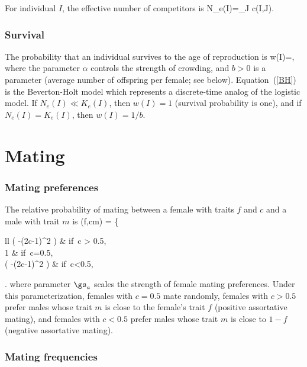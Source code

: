 \documentclass{article}
\begin{document}
For individual $I$, the effective number of competitors is 
\be
N_e(I)=\sum_J c(I,J).
\ee
\es

\subsubsection{Survival}

The probability that an individual survives to the age of reproduction is
	\be \label{BH}
		w(I)=,
	\ee
where the parameter $\alpha$ controls the strength of
crowding, and $b>0$ is a parameter (average number of offspring per female;
see below).  Equation~(\ref{BH}) is the Beverton-Holt model which
represents a discrete-time analog of the logistic model. If $N_e(I)\ll
K_e(I)$, then $w(I)=1$ (survival probability is one), and if
$N_e(I)=K_e(I)$, then $w(I)=1/b$.

\section{Mating}

\subsubsection{Mating preferences}

The relative probability of mating between a
female with traits $f$ and $c$ and a male with trait $m$ is
	\be  \label{pref}
	\psi(f,c\mid m) =  \left\{ \begin{array}{ll}
                         \exp \left( -(2c-1)^2 \right) & \mbox{if}\ c > 0.5, \\
			  1 & \mbox{if}\ c=0.5,\\
                         \exp \left( -(2c-1)^2 \right) & \mbox{if}\ c<0.5,
                      \end{array} \right.
	\ee
where parameter $\gs_a$ scales the strength of female mating preferences. Under this parameterization,
females with $c=0.5$ mate randomly, females with $c>0.5$ prefer males whose trait $m$ is close to 
the female's trait $f$ (positive assortative mating), and females with $c<0.5$ prefer males whose 
trait $m$ is close to $1-f$ (negative assortative mating). 


\subsubsection{Mating frequencies}
\end{document}
